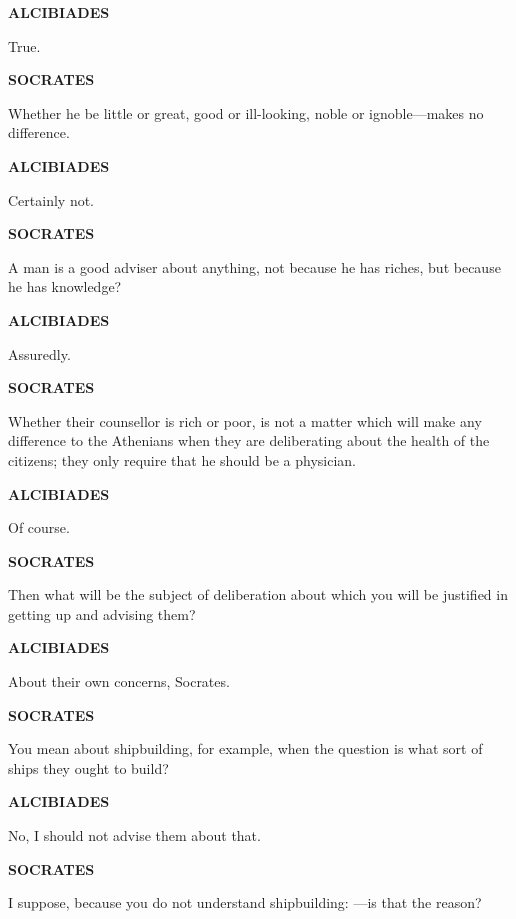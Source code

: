 \documentclass[11pt,letter]{article}
\begin{document}
\par \textbf{ALCIBIADES}
\par   True.

\par \textbf{SOCRATES}
\par   Whether he be little or great, good or ill-looking, noble or ignoble—makes no difference.

\par \textbf{ALCIBIADES}
\par   Certainly not.

\par \textbf{SOCRATES}
\par   A man is a good adviser about anything, not because he has riches, but because he has knowledge?

\par \textbf{ALCIBIADES}
\par   Assuredly.

\par \textbf{SOCRATES}
\par   Whether their counsellor is rich or poor, is not a matter which will make any difference to the Athenians when they are deliberating about the health of the citizens; they only require that he should be a physician.

\par \textbf{ALCIBIADES}
\par   Of course.

\par \textbf{SOCRATES}
\par   Then what will be the subject of deliberation about which you will be justified in getting up and advising them?

\par \textbf{ALCIBIADES}
\par   About their own concerns, Socrates.

\par \textbf{SOCRATES}
\par   You mean about shipbuilding, for example, when the question is what sort of ships they ought to build?

\par \textbf{ALCIBIADES}
\par   No, I should not advise them about that.

\par \textbf{SOCRATES}
\par   I suppose, because you do not understand shipbuilding: —is that the reason?
\end{document}
